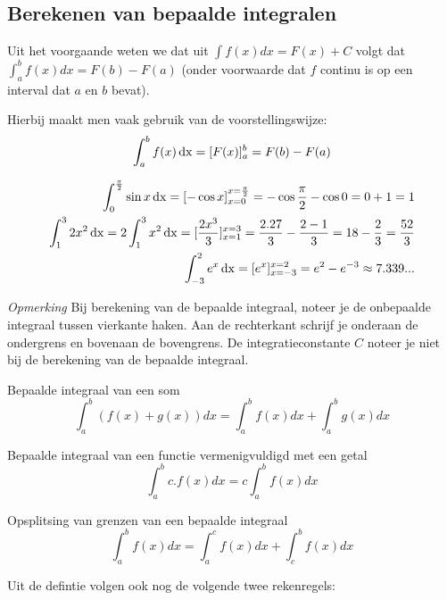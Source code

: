 \subsection{Berekenen van bepaalde integralen}

Uit het voorgaande weten we dat uit $\int f(x)dx=F(x)+C$ volgt dat $\int^b_a f(x)dx=F(b)-F(a)$ (onder voorwaarde dat $f$ continu is op een interval dat $a$ en $b$ bevat).

Hierbij maakt men vaak gebruik van de voorstellingswijze: 
\begin{equation*}
\int_{a}^{b} f(x) \operatorname{dx} = [F(x)]_a^b = F(b)-F(a)
\end{equation*}

\begin{voorbeeld}
	\begin{eqnarray*}
		\int_{0}^{\frac{\pi}{2}} \sin x \operatorname{dx} = [-\cos x]_{x=0}^{x=\frac{\pi}{2}}=-\cos \frac{\pi}{2}-\cos 0 = 0+1 = 1 \\
		\int_{1}^{3} 2x^2 \operatorname{dx} = 2\int_{1}^{3} x^2 \operatorname{dx} = [\frac{2x^3}{3}]_{x=1}^{x=3}=\frac{2.27}{3}-\frac{2-1}{3}=18-\frac{2}{3}=\frac{52}{3} \\
		\int_{-3}^{2} e^x \operatorname{dx} = [e^x]_{x=-3}^{x=2}=e^2-e^{-3}\approx 7.339...
	\end{eqnarray*}
\end{voorbeeld}

\emph{Opmerking}
Bij berekening van de bepaalde integraal, noteer je de onbepaalde integraal tussen vierkante haken. Aan de rechterkant schrijf je onderaan de ondergrens en bovenaan de bovengrens. De integratieconstante $C$ noteer je niet bij de berekening van de bepaalde integraal.

\begin{eigenschap} Bepaalde integraal van een som
\[\int^b_a (f(x)+g(x))dx = \int^b_a f(x)dx + \int^b_a g(x)dx\]
\end{eigenschap}

\begin{eigenschap} Bepaalde integraal van een functie vermenigvuldigd met een getal
	\[\int^b_a c.f(x)dx = c \int^b_a f(x)dx\]
\end{eigenschap}

\begin{eigenschap} Opsplitsing van grenzen van een bepaalde integraal
	\[\int^b_a f(x) dx = \int^c_a f(x)dx + \int^b_c f(x)dx\]
\end{eigenschap}

Uit de defintie volgen ook nog de volgende twee rekenregels:

